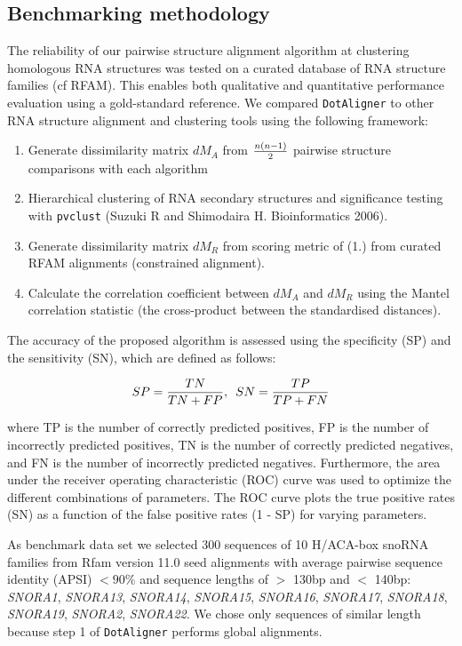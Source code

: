 \documentclass[a4paper,twoside]{article}
\newcommand\dotaligner{\texttt{DotAligner}}
\newcommand\pvclust{\texttt{pvclust}}
\newcommand{\GRAY}[1]{\textcolor{mygray}{#1}}
\begin{document}
\subsection{Benchmarking methodology} 

\noindent The reliability of our pairwise structure alignment algorithm at
clustering homologous RNA structures was tested on a curated database of RNA
structure families (cf RFAM). This enables both qualitative and quantitative
performance evaluation using a gold-standard reference. We compared
\texttt{DotAligner} to other RNA structure alignment and clustering tools using
the following framework: 

\begin{enumerate}
\item Generate dissimilarity matrix $dM_A$ from ${n(n-1)}\over{2}$ pairwise structure comparisons with each algorithm
\item Hierarchical clustering of RNA secondary structures and significance testing with \pvclust{} (Suzuki R and Shimodaira H. Bioinformatics 2006).
\item Generate dissimilarity matrix $dM_R$ from scoring metric of (1.) from curated RFAM alignments (constrained alignment). 
\item Calculate the correlation coefficient between $dM_A$ and $dM_R$ using the Mantel correlation statistic (the cross-product between the standardised distances). 
\end{enumerate}

\noindent The accuracy of the proposed algorithm is assessed using the
specificity (SP) and the sensitivity (SN), which are defined as follows:

\begin{equation}\label{eq13}
	SP = \frac{TN}{TN + FP}, \hspace{5px} SN = \frac{TP}{TP + FN}
\end{equation}

where TP is the number of correctly predicted positives, FP is the number of
incorrectly predicted positives, TN is the number of correctly predicted
negatives, and FN is the number of incorrectly predicted negatives.
Furthermore, the area under the receiver operating characteristic (ROC) curve
was used to optimize the different combinations of parameters. The ROC curve
plots the true positive rates (SN) as a function of the false positive rates (1
- SP) for varying parameters.

\GRAY{As benchmark data set we selected 300 sequences of 10 H/ACA-box snoRNA families
from Rfam version 11.0 seed alignments with average pairwise sequence identity
(APSI) $< 90\%$ and sequence lengths of $>$ 130bp and $<$ 140bp: \emph{SNORA1},
\emph{SNORA13}, \emph{SNORA14}, \emph{SNORA15}, \emph{SNORA16}, \emph{SNORA17},
\emph{SNORA18}, \emph{SNORA19}, \emph{SNORA2}, \emph{SNORA22}. We chose only
sequences of similar length because step 1 of \dotaligner{} performs global
alignments.}
\end{document}
